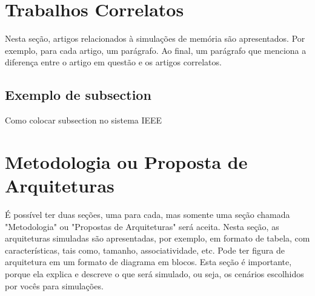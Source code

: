 \documentclass[conference]{IEEEtran}
\begin{document}
\begin{figure}[h!]

  \centering


\end{figure}
  

\section{Trabalhos Correlatos}

Nesta seção, artigos relacionados à simulações de memória são apresentados.
Por exemplo, para cada artigo, um parágrafo. Ao final, um parágrafo que menciona
a diferença entre o artigo em questão e os artigos correlatos.

\subsection{Exemplo de subsection}

Como colocar subsection no sistema IEEE

\section{Metodologia ou Proposta de Arquiteturas}

É possível ter duas seções, uma para cada, mas somente uma seção chamada 
"Metodologia" ou "Propostas de Arquiteturas" será aceita. Nesta seção, as 
arquiteturas simuladas são apresentadas, por exemplo, em formato de tabela, 
com características, tais como, tamanho, associatividade, etc.  Pode ter figura
de arquitetura em um formato de diagrama em blocos. Esta seção é importante, 
porque ela explica e descreve o que será simulado, ou seja, os cenários escolhidos 
por vocês para simulações.
\end{document}
